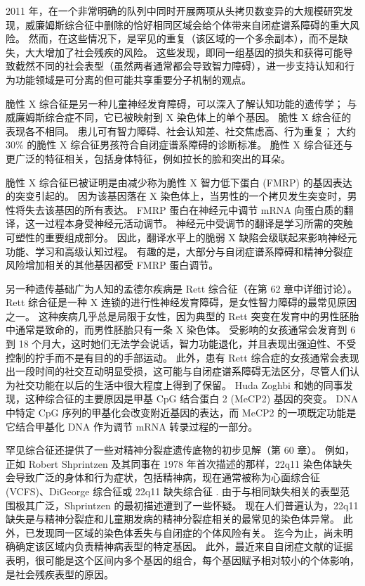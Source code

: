 2011 年，在一个非常明确的队列中同时开展两项从头拷贝数变异的大规模研究发现，威廉姆斯综合征中删除的恰好相同区域会给个体带来自闭症谱系障碍的重大风险。 然而，在这些情况下，是罕见的重复（该区域的一个多余副本），而不是缺失，大大增加了社会残疾的风险。 这些发现，即同一组基因的损失和获得可能导致截然不同的社会表型（虽然两者通常都会导致智力障碍），进一步支持认知和行为功能领域是可分离的但可能共享重要分子机制的观点。

脆性 X 综合征是另一种儿童神经发育障碍，可以深入了解认知功能的遗传学； 与威廉姆斯综合症不同，它已被映射到 X 染色体上的单个基因。 脆性 X 综合征的表现各不相同。 患儿可有智力障碍、社会认知差、社交焦虑高、行为重复； 大约 30\% 的脆性 X 综合征男孩符合自闭症谱系障碍的诊断标准。 脆性 X 综合征还与更广泛的特征相关，包括身体特征，例如拉长的脸和突出的耳朵。

脆性 X 综合征已被证明是由减少称为脆性 X 智力低下蛋白 (FMRP) 的基因表达的突变引起的。 因为该基因落在 X 染色体上，当男性的一个拷贝发生突变时，男性将失去该基因的所有表达。 FMRP 蛋白在神经元中调节 mRNA 向蛋白质的翻译，这一过程本身受神经元活动调节。 神经元中受调节的翻译是学习所需的突触可塑性的重要组成部分。 因此，翻译水平上的脆弱 X 缺陷会级联起来影响神经元功能、学习和高级认知过程。 有趣的是，大部分与自闭症谱系障碍和精神分裂症风险增加相关的其他基因都受 FMRP 蛋白调节。

另一种遗传基础广为人知的孟德尔疾病是 Rett 综合征（在第 62 章中详细讨论）。 Rett 综合征是一种 X 连锁的进行性神经发育障碍，是女性智力障碍的最常见原因之一。 这种疾病几乎总是局限于女性，因为典型的 Rett 突变在发育中的男性胚胎中通常是致命的，而男性胚胎只有一条 X 染色体。 受影响的女孩通常会发育到 6 到 18 个月大，这时她们无法学会说话，智力功能退化，并且表现出强迫性、不受控制的拧手而不是有目的的手部运动。 此外，患有 Rett 综合症的女孩通常会表现出一段时间的社交互动明显受损，这可能与自闭症谱系障碍无法区分，尽管人们认为社交功能在以后的生活中很大程度上得到了保留。 Huda Zoghbi 和她的同事发现，这种综合征的主要原因是甲基 CpG 结合蛋白 2 (MeCP2) 基因的突变。 DNA 中特定 CpG 序列的甲基化会改变附近基因的表达，而 MeCP2 的一项既定功能是它结合甲基化 DNA 作为调节 mRNA 转录过程的一部分。

罕见综合征还提供了一些对精神分裂症遗传底物的初步见解（第 60 章）。 例如，正如 Robert Shprintzen 及其同事在 1978 年首次描述的那样，22q11 染色体缺失会导致广泛的身体和行为症状，包括精神病，现在通常被称为心面综合征 (VCFS)、DiGeorge 综合征或 22q11 缺失综合征 . 由于与相同缺失相关的表型范围极其广泛，Shprintzen 的最初描述遭到了一些怀疑。 现在人们普遍认为，22q11 缺失是与精神分裂症和儿童期发病的精神分裂症相关的最常见的染色体异常。 此外，已发现同一区域的染色体丢失与自闭症的个体风险有关。 迄今为止，尚未明确确定该区域内负责精神病表型的特定基因。 此外，最近来自自闭症文献的证据表明，很可能是这个区间内多个基因的组合，每个基因赋予相对较小的个体影响，是社会残疾表型的原因。

